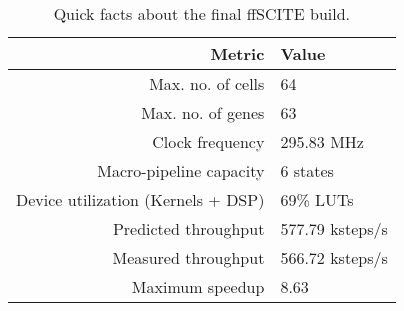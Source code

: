\begin{table}
    \centering
    \begin{tabular}{r|l}
        \textbf{Metric}                     & \textbf{Value} \\
        \hline
        Max. no. of cells                   & 64 \\
        Max. no. of genes                   & 63 \\
        Clock frequency                     & 295.83 MHz \\
        Macro-pipeline capacity             & 6 states \\
        Device utilization (Kernels + DSP)  & 69\% \acsp{LUT} \\
        Predicted throughput                & 577.79 ksteps/s \\
        Measured throughput                 & 566.72 ksteps/s \\
        Maximum speedup                     & 8.63 \\
    \end{tabular}
    \caption{Quick facts about the final \ac{ffSCITE} build.}
    \label{tab:quickfacts}
\end{table}





